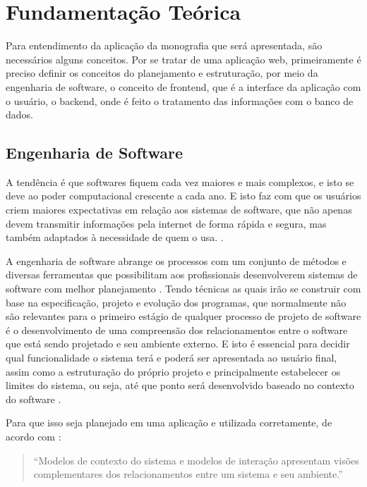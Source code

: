 \chapter{Fundamentação Teórica}\label{chp:LABEL_CHP_2}
Para entendimento da aplicação da monografia que será apresentada, são necessários alguns conceitos. Por se tratar de uma aplicação web, primeiramente é preciso definir os conceitos do planejamento e estruturação, por meio da engenharia de software, o conceito de frontend, que é a interface da aplicação com o usuário, o backend, onde é feito o tratamento das informações com o banco de dados.

\section{Engenharia de Software}\label{engsoft}
A tendência é que softwares fiquem cada vez maiores e mais complexos, e isto se deve ao poder computacional crescente a cada ano. E isto faz com que os usuários criem maiores expectativas em relação aos sistemas de software, que não apenas devem transmitir informações pela internet de forma rápida e segura, mas também adaptados à necessidade de quem o usa. \cite{SOMMERVILE}.

A engenharia de software abrange os processos com um conjunto de métodos e diversas ferramentas que possibilitam aos profissionais desenvolverem sistemas de software com melhor planejamento \cite{PRESSMAN}. Tendo técnicas as quais irão se construir com base na especificação, projeto e evolução dos programas, que normalmente não são relevantes para o primeiro estágio de qualquer processo de projeto de software é o desenvolvimento de uma compreensão dos relacionamentos entre o software que está sendo projetado e seu ambiente externo. E isto é essencial para decidir qual funcionalidade o sistema terá e poderá ser apresentada ao usuário final, assim como a estruturação do próprio projeto e principalmente estabelecer os limites do sistema, ou seja, até que ponto será desenvolvido baseado no contexto do software \cite{SOMMERVILE}.

Para que isso seja planejado em uma aplicação e utilizada corretamente, de acordo com \cite[p.126]{SOMMERVILE}: \begin{quote}
    “Modelos de contexto do sistema e modelos de interação apresentam visões complementares dos relacionamentos entre um sistema e seu ambiente.”
\end{quote} 
